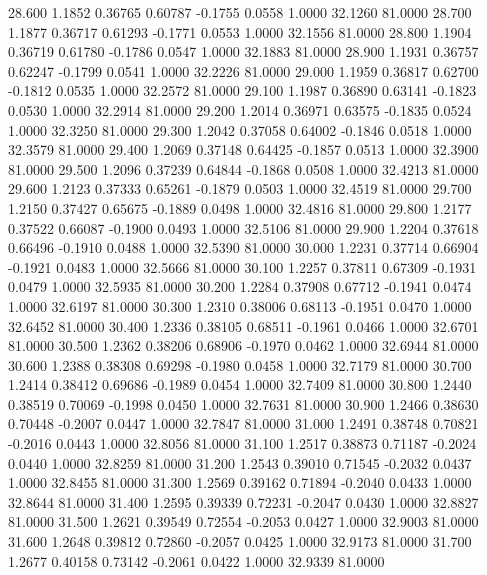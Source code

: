   28.600   1.1852   0.36765   0.60787  -0.1755   0.0558   1.0000  32.1260  81.0000
  28.700   1.1877   0.36717   0.61293  -0.1771   0.0553   1.0000  32.1556  81.0000
  28.800   1.1904   0.36719   0.61780  -0.1786   0.0547   1.0000  32.1883  81.0000
  28.900   1.1931   0.36757   0.62247  -0.1799   0.0541   1.0000  32.2226  81.0000
  29.000   1.1959   0.36817   0.62700  -0.1812   0.0535   1.0000  32.2572  81.0000
  29.100   1.1987   0.36890   0.63141  -0.1823   0.0530   1.0000  32.2914  81.0000
  29.200   1.2014   0.36971   0.63575  -0.1835   0.0524   1.0000  32.3250  81.0000
  29.300   1.2042   0.37058   0.64002  -0.1846   0.0518   1.0000  32.3579  81.0000
  29.400   1.2069   0.37148   0.64425  -0.1857   0.0513   1.0000  32.3900  81.0000
  29.500   1.2096   0.37239   0.64844  -0.1868   0.0508   1.0000  32.4213  81.0000
  29.600   1.2123   0.37333   0.65261  -0.1879   0.0503   1.0000  32.4519  81.0000
  29.700   1.2150   0.37427   0.65675  -0.1889   0.0498   1.0000  32.4816  81.0000
  29.800   1.2177   0.37522   0.66087  -0.1900   0.0493   1.0000  32.5106  81.0000
  29.900   1.2204   0.37618   0.66496  -0.1910   0.0488   1.0000  32.5390  81.0000
  30.000   1.2231   0.37714   0.66904  -0.1921   0.0483   1.0000  32.5666  81.0000
  30.100   1.2257   0.37811   0.67309  -0.1931   0.0479   1.0000  32.5935  81.0000
  30.200   1.2284   0.37908   0.67712  -0.1941   0.0474   1.0000  32.6197  81.0000
  30.300   1.2310   0.38006   0.68113  -0.1951   0.0470   1.0000  32.6452  81.0000
  30.400   1.2336   0.38105   0.68511  -0.1961   0.0466   1.0000  32.6701  81.0000
  30.500   1.2362   0.38206   0.68906  -0.1970   0.0462   1.0000  32.6944  81.0000
  30.600   1.2388   0.38308   0.69298  -0.1980   0.0458   1.0000  32.7179  81.0000
  30.700   1.2414   0.38412   0.69686  -0.1989   0.0454   1.0000  32.7409  81.0000
  30.800   1.2440   0.38519   0.70069  -0.1998   0.0450   1.0000  32.7631  81.0000
  30.900   1.2466   0.38630   0.70448  -0.2007   0.0447   1.0000  32.7847  81.0000
  31.000   1.2491   0.38748   0.70821  -0.2016   0.0443   1.0000  32.8056  81.0000
  31.100   1.2517   0.38873   0.71187  -0.2024   0.0440   1.0000  32.8259  81.0000
  31.200   1.2543   0.39010   0.71545  -0.2032   0.0437   1.0000  32.8455  81.0000
  31.300   1.2569   0.39162   0.71894  -0.2040   0.0433   1.0000  32.8644  81.0000
  31.400   1.2595   0.39339   0.72231  -0.2047   0.0430   1.0000  32.8827  81.0000
  31.500   1.2621   0.39549   0.72554  -0.2053   0.0427   1.0000  32.9003  81.0000
  31.600   1.2648   0.39812   0.72860  -0.2057   0.0425   1.0000  32.9173  81.0000
  31.700   1.2677   0.40158   0.73142  -0.2061   0.0422   1.0000  32.9339  81.0000
